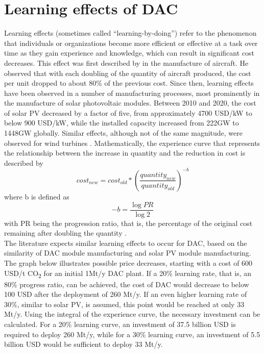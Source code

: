 \chapter{Learning effects of DAC}
Learning effects (sometimes called “learning-by-doing”) refer to the phenomenon that individuals or organizations become more efficient or effective at a task over time as they gain experience and knowledge, which can result in significant cost decreases.
This effect was first described by \textcite{Wright1936FactorsAirplanes} in the manufacture of aircraft. He observed that with each doubling of the quantity of aircraft produced, the cost per unit dropped to about 80\% of the previous cost. Since then, learning effects have been observed in a number of manufacturing processes, most prominently in the manufacture of solar photovoltaic modules. Between 2010 and 2020, the cost of solar PV decreased by a factor of five, from approximately 4700 USD/kW to below 900 USD/kW, while the installed capacity increased from 222GW to 1448GW globally. Similar effects, although not of the same magnitude, were observed for wind turbines \parencite{Shrestha2022LearningDeployment}. Mathematically, the experience curve that represents the relationship between the increase in quantity and the reduction in cost is described by \begin{equation} {cost_{new} = cost_{old}*\left( \frac{quantity_{new}}{quantity_{old}} \right)^{-b}} \end{equation} where b is defined as \begin{equation} -b = \frac{\log{PR}}{\log{2}} \end{equation} with PR being the progression ratio, that is, the percentage of the original cost remaining after doubling the quantity \parencite{Fasihi2019Techno-economicPlants}.\\
The literature expects similar learning effects to occur for DAC, based on the similarity of DAC module manufacturing and solar PV module manufacturing. The graph below illustrates possible price decreases, starting with a cost of 600 USD/t CO\textsubscript{2} for an initial 1Mt/y DAC plant. If a 20\% learning rate, that is, an 80\% progress ratio, can be achieved, the cost of DAC would decrease to below 100 USD after the deployment of 260 Mt/y. If an even higher learning rate of 30\%, similar to solar PV, is assumed, this point would be reached at only 33 Mt/y. Using the integral of the experience curve, the necessary investment can be calculated. For a 20\% learning curve, an investment of 37.5 billion USD is required to deploy 260 Mt/y, while for a 30\% learning curve, an investment of 5.5 billion USD would be sufficient to deploy 33 Mt/y.

